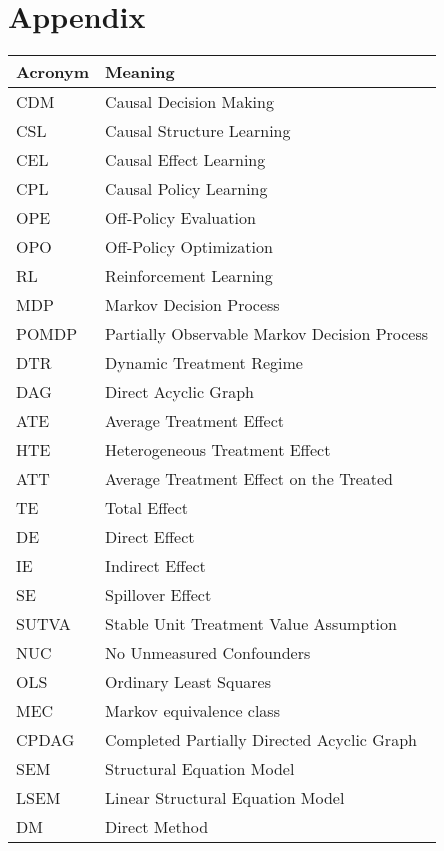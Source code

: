 \section{Appendix}


\begin{table}[tbh]
    \centering
    \begin{tabular}{l|l}
    \hline
    \textbf{Acronym} & \textbf{Meaning}\\
    \hline
        CDM & Causal Decision Making\\
        CSL &  Causal Structure Learning\\
        CEL & Causal Effect Learning\\
        CPL & Causal Policy Learning\\
        OPE & Off-Policy Evaluation\\
        OPO & Off-Policy Optimization\\
        RL  & Reinforcement Learning\\ 
        MDP  & Markov Decision Process\\ 
        POMDP  & Partially Observable Markov Decision Process\\ 
        DTR  & Dynamic Treatment Regime\\ 
        DAG  & Direct Acyclic Graph\\ 
        ATE  & Average Treatment Effect\\ 
        HTE  & Heterogeneous Treatment Effect\\ 
        ATT  & Average Treatment Effect on the Treated \\
        TE  & Total Effect\\ 
        DE  & Direct Effect\\ 
        IE  & Indirect Effect\\ 
        SE  & Spillover Effect\\ 
        SUTVA  & Stable Unit Treatment Value Assumption\\ 
        NUC  & No Unmeasured Confounders\\ 
        OLS  & Ordinary Least Squares\\ 
        MEC  & Markov equivalence class\\ 
        CPDAG  & Completed Partially Directed Acyclic Graph\\  
        SEM  & Structural Equation Model\\  
        LSEM &  Linear Structural Equation Model \\  
        DM  & Direct Method\\  

\end{tabular}
\end{table}

